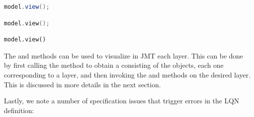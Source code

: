 \begin{JAVA}
\begin{lstlisting}[language=java, basicstyle=\ttfamily\scriptsize]
model.view();
\end{lstlisting}
\end{JAVA}
\begin{KOTLIN}
\begin{lstlisting}[language=kotlin, basicstyle=\ttfamily\scriptsize]
model.view();
\end{lstlisting}
\end{KOTLIN}
\begin{PYTHON}
\begin{lstlisting}[language=python]
model.view()
\end{lstlisting}
\end{PYTHON}

The  and  methods can be used to visualize in JMT each layer. This can be done by first calling the  method to obtain a  consisting of the  objects, each one corresponding to a layer, and then invoking the  and  methods on the desired layer. This is discussed in more details in the next section.

Lastly, we note a number of specification issues that trigger errors in the LQN definition:

